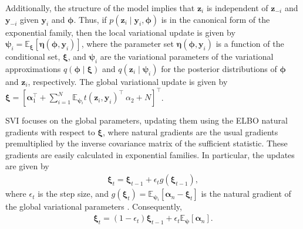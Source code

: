 Additionally, the structure of the model implies that $\boldsymbol{z}_i$ is independent of $\boldsymbol{z}_{-i}$ and $\boldsymbol{y}_{-i}$ given $\boldsymbol{y}_i$ and $\boldsymbol{\phi}$. Thus, if $p(\boldsymbol{z}_i \mid \boldsymbol{y}_i, \boldsymbol{\phi})$ is in the canonical form of the exponential family, then the local variational update is given by $\boldsymbol{\psi}_i = \mathbb{E}_{\boldsymbol{\xi}}[\boldsymbol{\eta}(\boldsymbol{\phi}, \boldsymbol{y}_i)]$, where the parameter set $\boldsymbol{\eta}(\boldsymbol{\phi}, \boldsymbol{y}_i)$ is a function of the conditional set, $\boldsymbol{\xi}$, and $\boldsymbol{\psi}_i$ are the variational parameters of the variational approximations $q(\boldsymbol{\phi} \mid \boldsymbol{\xi})$ and $q(\boldsymbol{z}_i \mid \boldsymbol{\psi}_i)$ for the posterior distributions of $\boldsymbol{\phi}$ and $\boldsymbol{z}_i$, respectively. The global variational update is given by $\boldsymbol{\xi} = [\boldsymbol{\alpha}_1^{\top} + \sum_{i=1}^N \mathbb{E}_{\boldsymbol{\psi}_i} t(\boldsymbol{z}_i, \boldsymbol{y}_i)^{\top} \ \alpha_2 + N]^{\top}$.

SVI focuses on the global parameters, updating them using the ELBO natural gradients with respect to $\boldsymbol{\xi}$, where natural gradients are the usual gradients premultiplied by the inverse covariance matrix of the sufficient statistic. These gradients are easily calculated in exponential families. In particular, the updates are given by
\begin{align*}
	\boldsymbol{\xi}_t=\boldsymbol{\xi}_{t-1}+\epsilon_t g(\boldsymbol{\xi}_{t-1}),
\end{align*} 
where $\epsilon_t$ is the step size, and $g(\boldsymbol{\xi}_t)=\mathbb{E}_{\boldsymbol{\psi}_i}[\boldsymbol{\alpha}_n-\boldsymbol{\xi}_t]$ is the natural gradient of the global variational parameters  \cite{blei2017variational}. Consequently,
\begin{align*}
	\boldsymbol{\xi}_t=(1-\epsilon_t)\boldsymbol{\xi}_{t-1}+\epsilon_t \mathbb{E}_{\boldsymbol{\psi}}[\boldsymbol{\alpha}_n].
\end{align*}    

